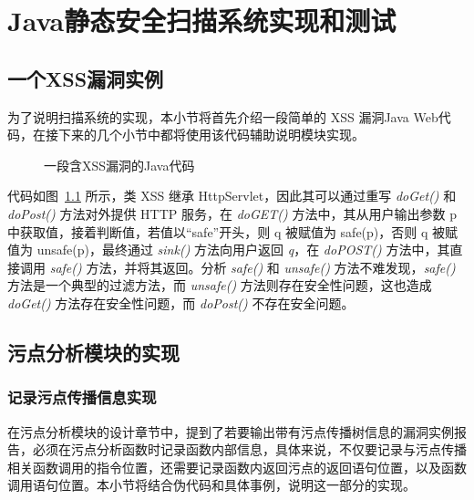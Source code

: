 \chapter{Java静态安全扫描系统实现和测试}
\section{一个XSS漏洞实例}
为了说明扫描系统的实现，本小节将首先介绍一段简单的 XSS 漏洞Java Web代码，在接下来的几个小节中都将使用该代码辅助说明模块实现。

\begin{figure}[!htbp]
    \noindent
    \centering
    \begin{minipage}[!htbp]{0.9\textwidth}
        
    \end{minipage}
    \caption{一段含XSS漏洞的Java代码}\label{code:xss}
\end{figure}

代码如图~\ref{code:xss} 所示，类 XSS 继承 HttpServlet，因此其可以通过重写 \textit{doGet()} 和 \textit{doPost()} 方法对外提供 HTTP 服务，在 \textit{doGET()} 方法中，其从用户输出参数 p 中获取值，接着判断值，若值以“safe”开头，则 q 被赋值为 safe(p)，否则 q 被赋值为 unsafe(p)，最终通过 \textit{sink()} 方法向用户返回 \textit{q}，在 \textit{doPOST()} 方法中，其直接调用 \textit{safe()} 方法，并将其返回。分析 \textit{safe()} 和 \textit{unsafe()} 方法不难发现，\textit{safe()} 方法是一个典型的过滤方法，而 \textit{unsafe()} 方法则存在安全性问题，这也造成 \textit{doGet()} 方法存在安全性问题，而 \textit{doPost()} 不存在安全问题。

\section{污点分析模块的实现}\label{sec:taintImp}
\subsection{记录污点传播信息实现}
在污点分析模块的设计章节中，提到了若要输出带有污点传播树信息的漏洞实例报告，必须在污点分析函数时记录函数内部信息，具体来说，不仅要记录与污点传播相关函数调用的指令位置，还需要记录函数内返回污点的返回语句位置，以及函数调用语句位置。本小节将结合伪代码和具体事例，说明这一部分的实现。

